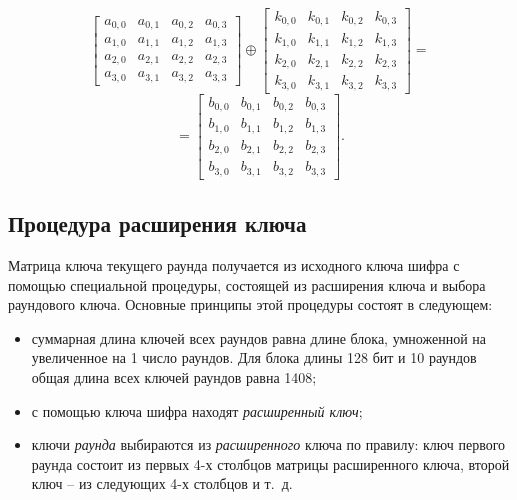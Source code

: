 \[
    \left[ \begin{array}{cccc}
        a_{0,0} & a_{0,1} & a_{0,2} & a_{0,3} \\
        a_{1,0} & a_{1,1} & a_{1,2} & a_{1,3} \\
        a_{2,0} & a_{2,1} & a_{2,2} & a_{2,3} \\
        a_{3,0} & a_{3,1} & a_{3,2} & a_{3,3}
    \end{array} \right]
    \oplus
    \left[ \begin{array}{cccc}
        k_{0,0} & k_{0,1} & k_{0,2} & k_{0,3} \\
        k_{1,0} & k_{1,1} & k_{1,2} & k_{1,3} \\
        k_{2,0} & k_{2,1} & k_{2,2} & k_{2,3} \\
        k_{3,0} & k_{3,1} & k_{3,2} & k_{3,3}
    \end{array} \right] =
\] \[
    = \left[ \begin{array}{cccc}
        b_{0,0} & b_{0,1} & b_{0,2} & b_{0,3} \\
        b_{1,0} & b_{1,1} & b_{1,2} & b_{1,3} \\
        b_{2,0} & b_{2,1} & b_{2,2} & b_{2,3} \\
        b_{3,0} & b_{3,1} & b_{3,2} & b_{3,3}
    \end{array} \right].
\]


\subsection{Процедура расширения ключа}

Матрица ключа текущего раунда получается из исходного ключа шифра с помощью специальной процедуры, состоящей из расширения ключа и выбора раундового ключа. Основные принципы этой процедуры состоят в следующем:
\begin{itemize}
    \item суммарная длина ключей всех раундов равна длине блока, умноженной на увеличенное на 1 число раундов. Для блока длины 128 бит и 10 раундов общая длина всех ключей раундов равна 1408;
    \item с помощью ключа шифра находят \emph{расширенный ключ};
    \item ключи \emph{раунда} выбираются из \emph{расширенного} ключа по правилу: ключ первого раунда состоит из первых 4-х столбцов матрицы расширенного ключа, второй ключ -- из следующих 4-х столбцов и т.~д.
\end{itemize}

